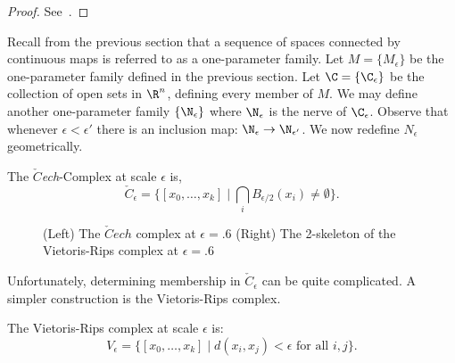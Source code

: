 \begin{proof}
See~\cite{hatcher}.
\end{proof}
Recall from the previous section that a sequence of spaces connected by continuous maps is referred to as a one-parameter family. Let $M = \{M_\epsilon\}$ be the one-parameter family defined in the previous section. Let $\C = \{\C_\epsilon\}$ be the collection of open sets in $\R^n$, defining every member of $M$. We may define another one-parameter family $\{ \N_\epsilon \}$ where $\N_\epsilon$ is the nerve of $\C_\epsilon$. Observe that whenever $\epsilon < \epsilon'$ there is an inclusion map: $\N_\epsilon \rightarrow \N_{\epsilon'}$.
We now redefine $N_{\epsilon}$ geometrically.
\begin{definition}
The \emph{$\check{C}$ech}-Complex at scale $\epsilon$ is,
\[ \check{C}_\epsilon = \{ [ x_0, \ldots,x_k] \mid \bigcap_i B_{\epsilon/2}(x_i)  \neq \emptyset \}. \]
\end{definition}
\begin{figure}
\centering
 \hspace{1cm}
\caption{(Left) The $\check{C}ech$ complex at $\epsilon = .6$ (Right) The 2-skeleton of the Vietoris-Rips complex at $\epsilon = .6$ }
\label{fig:c-and-r}
\end{figure}
Unfortunately, determining membership in $\check{C}_\epsilon$ can be quite complicated. A simpler construction is the 
Vietoris-Rips complex.
\begin{definition}
The Vietoris-Rips complex at scale $\epsilon$ is:
\[ V_\epsilon = \{ [x_0, \ldots, x_k] \mid d(x_i, x_j) < \epsilon \textrm{ for all } i,j  \}. \]
\end{definition}
